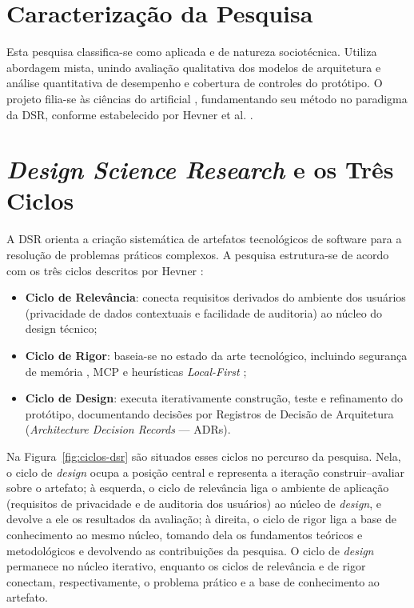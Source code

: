 \section{Caracterização da Pesquisa}
Esta pesquisa classifica-se como aplicada e de natureza sociotécnica. Utiliza abordagem mista, unindo avaliação qualitativa dos modelos de arquitetura e análise quantitativa de desempenho e cobertura de controles do protótipo. O projeto filia-se às ciências do artificial \cite{simon1996}, fundamentando seu método no paradigma da DSR, conforme estabelecido por Hevner et al. \cite{hevner2004}.

\section{\textit{Design Science Research} e os Três Ciclos}
A DSR orienta a criação sistemática de artefatos tecnológicos de software para a resolução de problemas práticos complexos. A pesquisa estrutura-se de acordo com os três ciclos descritos por Hevner \cite{hevner2007}:
\begin{itemize}
\item \textbf{Ciclo de Relevância}: conecta requisitos derivados do ambiente dos usuários (privacidade de dados contextuais e facilidade de auditoria) ao núcleo do design técnico;
\item \textbf{Ciclo de Rigor}: baseia-se no estado da arte tecnológico, incluindo segurança de memória \cite{nsa2022}, MCP \cite{anthropic2024} e heurísticas \textit{Local-First} \cite{kleppmann2019};
\item \textbf{Ciclo de Design}: executa iterativamente construção, teste e refinamento do protótipo, documentando decisões por Registros de Decisão de Arquitetura (\textit{Architecture Decision Records} --- ADRs).
\end{itemize}
Na Figura~\ref{fig:ciclos-dsr} são situados esses ciclos no percurso da pesquisa. Nela, o ciclo de \textit{design} ocupa a posição central e representa a iteração construir--avaliar sobre o artefato; à esquerda, o ciclo de relevância liga o ambiente de aplicação (requisitos de privacidade e de auditoria dos usuários) ao núcleo de \textit{design}, e devolve a ele os resultados da avaliação; à direita, o ciclo de rigor liga a base de conhecimento ao mesmo núcleo, tomando dela os fundamentos teóricos e metodológicos e devolvendo as contribuições da pesquisa. O ciclo de \textit{design} permanece no núcleo iterativo, enquanto os ciclos de relevância e de rigor conectam, respectivamente, o problema prático e a base de conhecimento ao artefato.

